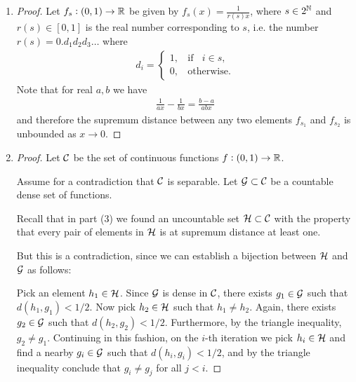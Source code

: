 \begin{enumerate}
\begin{proof}
    Finally we must show that $\{g_n ~|~ n \in \N\}$ is countable. Note that $g_n$ is piecewise affine for a
    given $n$, and that the $x$-coordinates of the endpoints are fixed. Thus for a given $n$, the cardinality
    of $\{g_n\}$ is equal to the cardinality of the set of possible $y$-coordinates. The latter set is $\Q^n$.
    Thus the cardinality of $\{g_n ~|~ n \in \N\}$ is equal to the cardinality of the
    set $\bigcup_{n\in \N} \Q^n$. This is a countable union of countable sets and is therefore countable.
  \end{proof}

\item
  \begin{proof}
    Let $f_s: (0, 1) \to \mathbb{R}$ be given by $f_s(x) = \frac{1}{r(s)x}$, where $s \in 2^{\mathbb{N}}$ and $r(s) \in [0, 1]$ is
    the real number corresponding to $s$, i.e. the number $r(s) = 0.d_1d_2d_3\ldots$ where
    \begin{align*}
      d_i =
      \begin{cases}
        1, ~~~~ \text{if} ~~~~ i \in s,\\
        0, ~~~~ \text{otherwise}.
      \end{cases}
    \end{align*}
    Note that for real $a, b$ we have
    \begin{align*}
      \frac{1}{ax} - \frac{1}{bx} = \frac{b - a}{abx}
    \end{align*}
    and therefore the supremum distance between any two elements $f_{s_1}$ and $f_{s_2}$ is unbounded
    as $x \to 0$.
  \end{proof}
\item
  \begin{proof}
    Let $\mathcal C$ be the set of continuous functions $f: (0, 1) \to \mathbb{R}$.

    Assume for a contradiction that $\mathcal C$ is separable. Let $\mathcal G \subset \mathcal C$ be a countable dense set of
    functions.

    Recall that in part (3) we found an uncountable set $\mathcal H \subset \mathcal C$ with the property that every pair
    of elements in $\mathcal H$ is at supremum distance at least one.

    But this is a contradiction, since we can establish a bijection between $\mathcal H$ and $\mathcal G$ as follows:

    Pick an element $h_1 \in \mathcal H$. Since $\mathcal G$ is dense in $\mathcal C$, there exists $g_1 \in \mathcal G$ such
    that $d(h_1, g_1) < 1/2$. Now pick $h_2 \in \mathcal H$ such that $h_1 \neq h_2$. Again, there
    exists $g_2 \in \mathcal G$ such that $d(h_2, g_2) < 1/2$. Furthermore, by the triangle
    inequality, $g_2 \neq g_1$. Continuing in this fashion, on the $i$-th iteration we pick $h_i \in \mathcal H$ and
    find a nearby $g_i \in \mathcal G$ such that $d(h_i, g_i) < 1/2$, and by the triangle inequality conclude
    that $g_i \neq g_j$ for all $j < i$.


\end{proof}
\end{enumerate}
